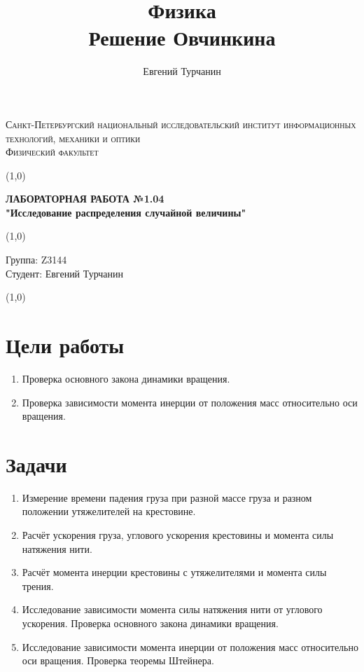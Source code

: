 \documentclass[a4paper]{article}
\title{\Huge{Физика}\\ Решение Овчинкина}
\author{\huge{Евгений Турчанин}}
\date{}
\begin{document}
\begin{center}
\textsc{Санкт-Петербургский национальный исследовательский институт информационных технологий, механики и оптики\\[3mm]
Физический факультет} \\[3mm]

\end{center}
\vspace{5mm}
\line(1,0){\textwidth}
\begin{center}
\textbf{ЛАБОРАТОРНАЯ РАБОТА №1.04\\}
\textbf{"Исследование распределения случайной величины"}
\end{center}
\vspace{2mm}
\line(1,0){\textwidth}
\vspace{5mm}
\begin{minipage}{0.4\textwidth}
    Группа: Z3144 \\
    Студент: Евгений Турчанин\\
    \vspace{1mm}
\end{minipage}
\hfill
\vspace{1mm}
\line(1,0){\textwidth}


\section{Цели работы}
\begin{enumerate}
    \item Проверка основного закона динамики вращения.
    \item Проверка зависимости момента инерции от положения масс относительно оси вращения.
\end{enumerate}

\section{Задачи}
\begin{enumerate}
    \item Измерение времени падения груза при разной массе груза и разном положении утяжелителей на крестовине.
    \item Расчёт ускорения груза, углового ускорения крестовины и момента силы натяжения нити.
    \item Расчёт момента инерции крестовины с утяжелителями и момента силы трения.
    \item Исследование зависимости момента силы натяжения нити от углового ускорения. Проверка основного закона динамики вращения.
    \item Исследование зависимости момента инерции от положения масс относительно оси вращения. Проверка теоремы Штейнера.
\end{enumerate}
\end{document}
